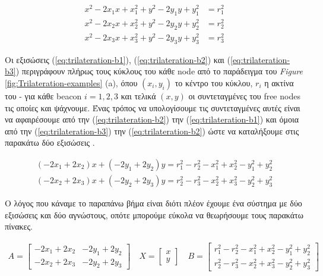 \begin{align}
	x^2-2 x_1 x + x_1^2 + y^2-2 y_1 y + y_1^2 &= r_1^2 \label{eq:trilateration-b1} \\ 
	x^2-2 x_2 x + x_2^2 + y^2-2 y_2 y + y_2^2 &= r_2^2 \label{eq:trilateration-b2} \\
	x^2-2 x_3 x + x_3^2 + y^2-2 y_3 y + y_3^2 &= r_3^2 \label{eq:trilateration-b3} 
\end{align}

Οι εξισώσεις (\ref{eq:trilateration-b1}), (\ref{eq:trilateration-b2}) και (\ref{eq:trilateration-b3}) περιγράφουν πλήρως τους κύκλους του κάθε node από το παράδειγμα 
του \emph{Figure} \ref{fig:Trilateration-examples} (a),
όπου $(x_i,y_i)$ το κέντρο του κύκλου, $r_i$ η ακτίνα του - για κάθε beacon $i=1,2,3$ και τελικά $(x,y)$ οι συντεταγμένες του free nodes τις οποίες και ψάχνουμε. 
Ένας τρόπος να υπολογίσουμε τις συντεταγμένες αυτές είναι να αφαιρέσουμε από την (\ref{eq:trilateration-b2}) την (\ref{eq:trilateration-b1}) και όμοια από την 
(\ref{eq:trilateration-b3}) την (\ref{eq:trilateration-b2}) ώστε να καταλήξουμε στις παρακάτω δύο εξισώσεις \cite{trilateration-equations} \cite{localization-algorithms-for-wsn}.

\begin{align}
	(-2x_1+2x_2)x + (-2y_1+2y_2)y = r_1^2 - r_2^2 - x_1^2 + x_2^2 - y_1^2 + y_2^2  \nonumber \\
	(-2x_2+2x_3)x + (-2y_2+2y_3)y = r_2^2 - r_3^2 - x_2^2 + x_3^2 - y_2^2 + y_3^2  \nonumber
\end{align}

Ο λόγος που κάναμε το παραπάνω βήμα είναι διότι πλέον έχουμε ένα σύστημα με δύο εξισώσεις και δύο αγνώστους, οπότε μπορούμε εύκολα να θεωρήσουμε τους παρακάτω πίνακες.

\begin{align}
	A = \begin{bmatrix} -2x_1+2x_2 & -2y_1+2y_2 \\ -2x_2+2x_3 & -2y_2+2y_3 \end{bmatrix} \nonumber \quad
	X = \begin{bmatrix} x \\ y \end{bmatrix} \nonumber \quad
	B = \begin{bmatrix} r_1^2 - r_2^2 - x_1^2 + x_2^2 - y_1^2 + y_2^2 \\ r_2^2 - r_3^2 - x_2^2 + x_3^2 - y_2^2 + y_3^2 \end{bmatrix} \nonumber
\end{align}

